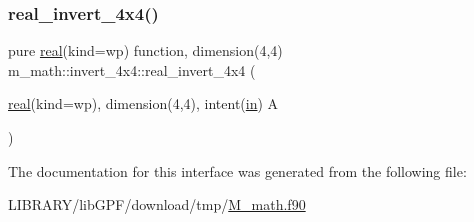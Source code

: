 \subsubsection{\texorpdfstring{real\+\_\+invert\+\_\+4x4()}{real\_invert\_4x4()}}
{\footnotesize\ttfamily pure \hyperlink{read__watch_83_8txt_abdb62bde002f38ef75f810d3a905a823}{real}(kind=wp) function, dimension(4,4) m\+\_\+math\+::invert\+\_\+4x4\+::real\+\_\+invert\+\_\+4x4 (\begin{DoxyParamCaption}\item[{\hyperlink{read__watch_83_8txt_abdb62bde002f38ef75f810d3a905a823}{real}(kind=wp), dimension(4,4), intent(\hyperlink{M__journal_83_8txt_afce72651d1eed785a2132bee863b2f38}{in})}]{A }\end{DoxyParamCaption})\hspace{0.3cm}{\ttfamily [private]}}



The documentation for this interface was generated from the following file\+:\begin{DoxyCompactItemize}
\item 
L\+I\+B\+R\+A\+R\+Y/lib\+G\+P\+F/download/tmp/\hyperlink{M__math_8f90}{M\+\_\+math.\+f90}\end{DoxyCompactItemize}
